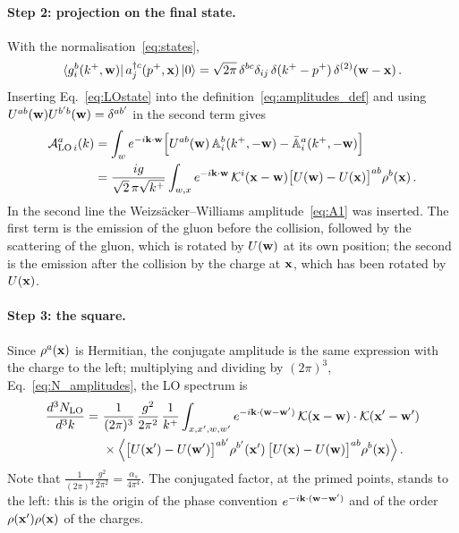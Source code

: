 \paragraph{Step 2: projection on the final state.} With the normalisation~\eqref{eq:states},
\begin{align}
\bra{g^b_i(k^+,\mathbf{w})}a^{\dagger c}_j(p^+,\mathbf{x})\ket0=\sqrt{2\pi}\,\delta^{bc}\delta_{ij}\,\delta(k^+-p^+)\,\delta^{(2)}(\mathbf{w}-\mathbf{x})\,.
\end{align}
Inserting Eq.~\eqref{eq:LOstate} into the definition~\eqref{eq:amplitudes_def} and using $U^{ab}(\mathbf{w})U^{b'b}(\mathbf{w})=\delta^{ab'}$ in the second term gives
\begin{align}\label{eq:ALO}
\mathcal A^{a}_{{\rm LO}\,i}(k)&=\int_{w}e^{-i\mathbf{k}\cdot\mathbf{w}}\Big[U^{ab}(\mathbf{w})\,\mathbb{A}^b_i(k^+,-\mathbf{w})-\bar{\mathbb{A}}^a_i(k^+,-\mathbf{w})\Big]
\notag\\&=\frac{ig}{\sqrt2\,\pi\sqrt{k^+}}\int_{w,x}e^{-i\mathbf{k}\cdot\mathbf{w}}\,\mathcal{K}^i(\mathbf{x}-\mathbf{w})\big[U(\mathbf{w})-U(\mathbf{x})\big]^{ab}\rho^b(\mathbf{x})\,.
\end{align}
In the second line the Weizs\"acker--Williams amplitude~\eqref{eq:A1} was inserted. The first term is the emission of the gluon before the collision, followed by the scattering of the gluon, which is rotated by $U(\mathbf{w})$ at its own position; the second is the emission after the collision by the charge at $\mathbf{x}$, which has been rotated by $U(\mathbf{x})$.

\paragraph{Step 3: the square.} Since $\rho^a(\mathbf{x})$ is Hermitian, the conjugate amplitude is the same expression with the charge to the left; multiplying and dividing by $(2\pi)^3$, Eq.~\eqref{eq:N_amplitudes}, the LO spectrum is
\begin{align}\label{eq:LO}
\frac{d^3N_{\rm LO}}{d^3k}=\ &\frac{1}{(2\pi)^3}\,\frac{g^2}{2\pi^2}\,\frac{1}{k^+}\int_{x,x',w,w'}e^{-i\v k\cdot(\v w-\v w')}\,
\Kv(\v x-\v w)\cdot\Kv(\v x'-\v w')
\notag\\&\times
\Big\langle\big[U(\v x')-U(\v w')\big]^{ab'}\rho^{b'}(\v x')\,\big[U(\v x)-U(\v w)\big]^{ab}\rho^{b}(\v x)\Big\rangle\,.
\end{align}
Note that $\frac{1}{(2\pi)^3}\frac{g^2}{2\pi^2}=\frac{\alpha_s}{4\pi^4}$. The conjugated factor, at the primed points, stands to the left: this is the origin of the phase convention $e^{-i\mathbf{k}\cdot(\mathbf{w}-\mathbf{w}')}$ and of the order $\rho(\mathbf{x}')\rho(\mathbf{x})$ of the charges.

